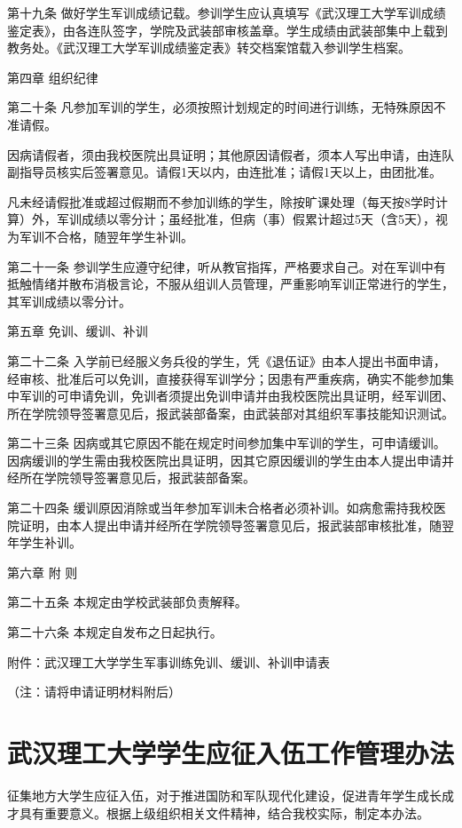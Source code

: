 \documentclass[UTF8,12pt,a4paper]{report}
\begin{document}
第十九条 做好学生军训成绩记载。参训学生应认真填写《武汉理工大学军训成绩鉴定表》，由各连队签字，学院及武装部审核盖章。学生成绩由武装部集中上载到教务处。《武汉理工大学军训成绩鉴定表》转交档案馆载入参训学生档案。

第四章 组织纪律

第二十条 凡参加军训的学生，必须按照计划规定的时间进行训练，无特殊原因不准请假。

因病请假者，须由我校医院出具证明；其他原因请假者，须本人写出申请，由连队副指导员核实后签署意见。请假1天以内，由连批准；请假1天以上，由团批准。

凡未经请假批准或超过假期而不参加训练的学生，除按旷课处理（每天按8学时计算）外，军训成绩以零分计；虽经批准，但病（事）假累计超过5天（含5天），视为军训不合格，随翌年学生补训。

第二十一条 参训学生应遵守纪律，听从教官指挥，严格要求自己。对在军训中有抵触情绪并散布消极言论，不服从组训人员管理，严重影响军训正常进行的学生，其军训成绩以零分计。

第五章 免训、缓训、补训

第二十二条 入学前已经服义务兵役的学生，凭《退伍证》由本人提出书面申请，经审核、批准后可以免训，直接获得军训学分；因患有严重疾病，确实不能参加集中军训的可申请免训，免训者须提出免训申请并由我校医院出具证明，经军训团、所在学院领导签署意见后，报武装部备案，由武装部对其组织军事技能知识测试。

第二十三条 因病或其它原因不能在规定时间参加集中军训的学生，可申请缓训。因病缓训的学生需由我校医院出具证明，因其它原因缓训的学生由本人提出申请并经所在学院领导签署意见后，报武装部备案。

第二十四条 缓训原因消除或当年参加军训未合格者必须补训。如病愈需持我校医院证明，由本人提出申请并经所在学院领导签署意见后，报武装部审核批准，随翌年学生补训。

第六章 附 则

第二十五条 本规定由学校武装部负责解释。

第二十六条 本规定自发布之日起执行。

附件：武汉理工大学学生军事训练免训、缓训、补训申请表

（注：请将申请证明材料附后）

\chapter{武汉理工大学学生应征入伍工作管理办法}
征集地方大学生应征入伍，对于推进国防和军队现代化建设，促进青年学生成长成才具有重要意义。根据上级组织相关文件精神，结合我校实际，制定本办法。
\end{document}
